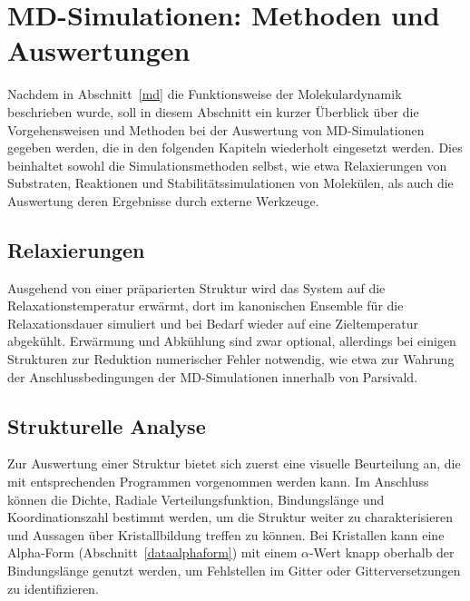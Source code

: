 \section{MD-Simulationen: Methoden und Auswertungen}
\label{mdmethods}


Nachdem in Abschnitt~\ref{md} die Funktionsweise der Molekulardynamik beschrieben wurde, soll in diesem Abschnitt ein kurzer Überblick über die Vorgehensweisen und Methoden bei der Auswertung von MD-Simulationen gegeben werden, die in den folgenden Kapiteln wiederholt eingesetzt werden.
Dies beinhaltet sowohl die Simulationsmethoden selbst, wie etwa Relaxierungen von Substraten, Reaktionen und Stabilitätssimulationen von Molekülen, als auch die Auswertung deren Ergebnisse durch externe Werkzeuge.

\subsection{Relaxierungen}


Ausgehend von einer präparierten Struktur wird das System auf die Relaxationstemperatur erwärmt, dort im kanonischen Ensemble für die Relaxationsdauer simuliert und bei Bedarf wieder auf eine Zieltemperatur abgekühlt.
Erwärmung und Abkühlung sind zwar optional, allerdings bei einigen Strukturen zur Reduktion numerischer Fehler notwendig, wie etwa zur Wahrung der Anschlussbedingungen der MD-Simulationen innerhalb von Parsivald.

\subsection{Strukturelle Analyse}

Zur Auswertung einer Struktur bietet sich zuerst eine visuelle Beurteilung an, die mit entsprechenden Programmen vorgenommen werden kann.
Im Anschluss können die Dichte, Radiale Verteilungsfunktion, Bindungslänge und Koordinationszahl bestimmt werden, um die Struktur weiter zu charakterisieren und Aussagen über Kristallbildung treffen zu können.
Bei Kristallen kann eine Alpha-Form (Abschnitt~\ref{dataalphaform}) mit einem $\alpha$-Wert knapp oberhalb der Bindungslänge genutzt werden, um Fehlstellen im Gitter oder Gitterversetzungen zu identifizieren.


